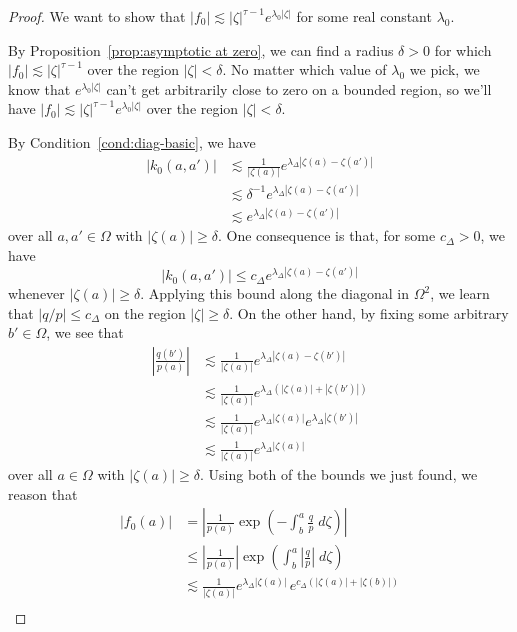 \documentclass{article}
\theoremstyle{definition}
\theoremstyle{plain}
\newcommand{\hardker}{k_0}
\newcommand{\solproto}{f_0}
\newcommand{\domain}{\Omega}
\begin{document}
\begin{proof}
We want to show that $|\solproto| \lesssim |\zeta|^{\tau-1} e^{\lambda_0|\zeta|}$ for some real constant $\lambda_0$.

By Proposition~\ref{prop:asymptotic at zero}, we can find a radius $\delta > 0$ for which $|\solproto| \lesssim |\zeta|^{\tau-1}$ over the region $|\zeta| < \delta$. No matter which value of $\lambda_0$ we pick, we know that $e^{\lambda_0|\zeta|}$ can't get arbitrarily close to zero on a bounded region, so we'll have $|\solproto| \lesssim |\zeta|^{\tau-1} e^{\lambda_0|\zeta|}$ over the region $|\zeta| < \delta$.

By Condition~\eqref{cond:diag-basic}, we have
\begin{align*}
|\hardker(a, a')| & \lesssim \frac{1}{|\zeta(a)|} e^{\lambda_\Delta |\zeta(a) - \zeta(a')|} \\
& \lesssim \delta^{-1} e^{\lambda_\Delta |\zeta(a) - \zeta(a')|} \\
& \lesssim e^{\lambda_\Delta |\zeta(a) - \zeta(a')|}
\end{align*}
over all $a, a' \in \domain$ with $|\zeta(a)| \ge \delta$. One consequence is that, for some $c_\Delta > 0$, we have
\[ |\hardker(a, a')| \le c_\Delta e^{\lambda_\Delta |\zeta(a) - \zeta(a')|} \]
whenever $|\zeta(a)| \ge \delta$. Applying this bound along the diagonal in $\domain^2$, we learn that $|q/p| \le c_\Delta$ on the region $|\zeta| \ge \delta$. On the other hand, by fixing some arbitrary  $b' \in \domain$, we see that
\begin{align*}
\left|\frac{q(b')}{p(a)}\right| & \lesssim \frac{1}{|\zeta(a)|} e^{\lambda_\Delta|\zeta(a) - \zeta(b')|} \\
& \lesssim \frac{1}{|\zeta(a)|} e^{\lambda_\Delta(|\zeta(a)| + |\zeta(b')|)} \\
& \lesssim \frac{1}{|\zeta(a)|} e^{\lambda_\Delta|\zeta(a)|} e^{\lambda_\Delta|\zeta(b')|} \\
& \lesssim \frac{1}{|\zeta(a)|} e^{\lambda_\Delta|\zeta(a)|}
\end{align*}
over all $a \in \domain$ with $|\zeta(a)| \ge \delta$. Using both of the bounds we just found, we reason that
\begin{align*}
|\solproto(a)| & = \left| \frac{1}{p(a)} \exp\left(-\int_{b}^{a}\frac{q}{p}\;d\zeta\right) \right| \\
& \le \left|\frac{1}{p(a)}\right| \exp\left(\int_{b}^{a}\left|\frac{q}{p}\right|\;d\zeta\right) \\
& \lesssim \frac{1}{|\zeta(a)|} e^{\lambda_\Delta|\zeta(a)|}\,e^{c_\Delta(|\zeta(a)| + |\zeta(b)|)} \\

\end{align*}
\end{proof}
\end{document}
